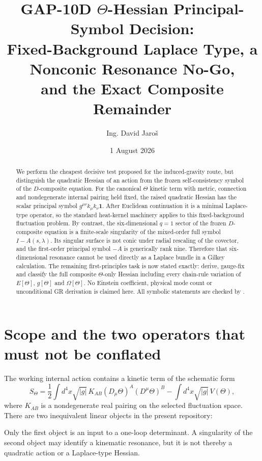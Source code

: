 \documentclass[11pt,a4paper]{article}
\title{GAP-10D $\Theta$-Hessian Principal-Symbol Decision:\\
Fixed-Background Laplace Type, a Nonconic Resonance No-Go,\\
and the Exact Composite Remainder}
\author{Ing. David Jaro\v{s}}
\date{1 August 2026}
\newcommand{\Hess}{\mathcal H}
\begin{document}
\maketitle
\UBTProvenanceNotice

\begin{abstract}
We perform the cheapest decisive test proposed for the induced-gravity route,
but distinguish the quadratic Hessian of an action from the frozen
self-consistency symbol of the $D$-composite equation.  For the canonical
$\Theta$ kinetic term with metric, connection and nondegenerate internal
pairing held fixed, the raised quadratic Hessian has the scalar principal
symbol
\(
 g^{\mu\nu}k_\mu k_\nu\mathbf1
\).
After Euclidean continuation it is a minimal Laplace-type operator, so the
standard heat-kernel machinery applies to this fixed-background fluctuation
problem.  By contrast, the six-dimensional $q=1$ sector of the frozen
$D$-composite equation is a finite-scale singularity of the mixed-order full
symbol $I-A(s,\lambda)$.  Its singular surface is not conic under radial
rescaling of the covector, and the first-order principal symbol $-A$ is
generically rank nine.  Therefore that six-dimensional resonance cannot be
used directly as a Laplace bundle in a Gilkey calculation.  The remaining
first-principles task is now stated exactly: derive, gauge-fix and classify the
full composite $\Theta$-only Hessian including every chain-rule variation of
$E[\Theta]$, $g[\Theta]$ and $\Omega[\Theta]$.  No Einstein coefficient,
physical mode count or unconditional GR derivation is claimed here.  All
symbolic statements are checked by
.
\end{abstract}

\section{Scope and the two operators that must not be conflated}
The working internal action contains a kinetic term of the schematic form
\begin{equation}
 S_\Theta=\frac12\int d^4x\sqrt{|g|}\,
 K_{AB}(D_\mu\Theta)^A(D^\mu\Theta)^B-\int d^4x\sqrt{|g|}\,V(\Theta),
 \label{eq:kinetic}
\end{equation}
where $K_{AB}$ is a nondegenerate real pairing on the selected fluctuation
space.  There are two inequivalent linear objects in the present repository:
Only the first object is an input to a one-loop determinant.  A singularity of
the second object may identify a kinematic resonance, but it is not thereby a
quadratic action or a Laplace-type Hessian.
\end{document}
